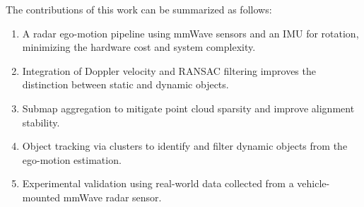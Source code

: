 The contributions of this work can be summarized as follows:  
\begin{enumerate}
    \item A radar ego-motion pipeline using mmWave sensors and an IMU for rotation, minimizing the hardware cost and system complexity.
    \item Integration of Doppler velocity and RANSAC filtering improves the distinction between static and dynamic objects.
    \item Submap aggregation to mitigate point cloud sparsity and improve alignment stability.
    \item Object tracking via clusters to identify and filter dynamic objects from the ego-motion estimation.
    \item Experimental validation using real-world data collected from a vehicle-mounted mmWave radar sensor.  
\end{enumerate}



